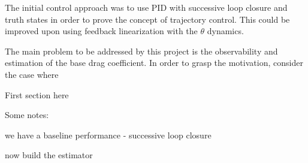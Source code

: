 \documentclass{article}
\begin{document}
  The initial control approach was to use PID with successive loop closure and truth states in order to prove the concept of trajectory control. This could be improved upon using feedback linearization with the $\theta$ dynamics.

  The main problem to be addressed by this project is the observability and estimation of the base drag coefficient. In order to grasp the motivation, consider the case where 



  First section here

  Some notes:

  we have a baseline performance - successive loop closure

  now build the estimator
\end{document}
